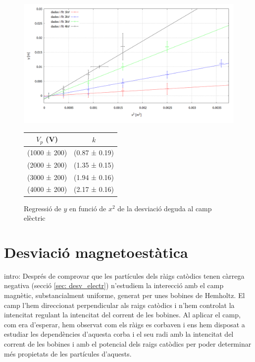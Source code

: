 \documentclass[11pt]{article}
\begin{document}
\begin{figure}[h]
    \centering
    \begin{minipage}{0.45\textwidth}
    \centering
        \includegraphics[width=1\linewidth]{Plot yvsx.PNG}
        \caption{Regressió de $y$ en funció de $x^2$  de la desviació deguda al camp elèctric}
        \label{fig: Regressió Desv E}
    \end{minipage}
    \hfill
    \begin{minipage}{0.45\textwidth} 
        \centering
        \begin{tabular}{|c|c|}
            \hline
            $V_p$ (V)	&	$k$	\\\hline
            (1000 ± 200)	&	(0.87 ± 0.19)   \\\hline
            (2000 ± 200)	&	(1.35 ± 0.15)	\\\hline
            (3000 ± 200)	&	(1.94 ± 0.16)	\\\hline
            (4000 ± 200)	&	(2.17 ± 0.16)	\\\hline           
        \end{tabular}
        \label{tab:kvsVp}
    \end{minipage}
\end{figure}

\section{Desviació magnetoestàtica}\label{sec: desv_magn}
intro: Després de comprovar que les partícules dels ràigs catòdics tenen càrrega negativa (secció \ref{sec: desv_electr}) n'estudiem la interecció amb el camp magnètic, substancialment uniforme, generat per unes bobines de Hemholtz. 
El camp l'hem direccionat perpendicular als raigs catòdics i n'hem controlat la intencitat regulant la intencitat del corrent de les bobines. Al aplicar el camp, com era d'esperar, hem observat com els ràigs es corbaven i ens hem disposat a estudiar les dependències d'aquesta corba i el seu radi amb la intencitat del corrent de les bobines i amb el potencial dels raigs catòdics per poder determinar més propietats de les partícules d'aquests. 
\end{document}
